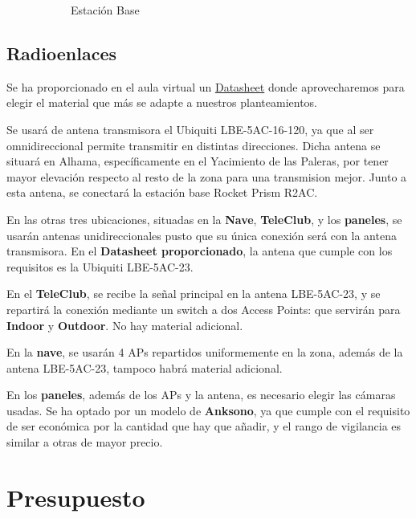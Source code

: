 \documentclass{article}
\begin{document}
\begin{figure}[ht]
\begin{subfigure}{0.25\textwidth}
		\caption{Estación Base}
		\label{fig:estacionbase}
	\end{subfigure}
	\caption{}
	\label{fig:accesspoint}
\end{figure}
\subsection{Radioenlaces}

Se ha proporcionado en el aula virtual un \href{http://www.microcom.com.ar/fotos/ficha7097LBE-M5-23.compressed.pdf}{Datasheet} donde aprovecharemos para elegir el material que más se adapte a nuestros planteamientos. 

\quad

Se usará de antena transmisora el Ubiquiti LBE-5AC-16-120, ya que al ser omnidireccional permite transmitir en distintas direcciones. Dicha antena se situará en Alhama, específicamente en el Yacimiento de las Paleras, por tener mayor elevación respecto al resto de la zona para una transmision mejor. Junto a esta antena, se conectará la estación base Rocket Prism R2AC.

\quad

En las otras tres ubicaciones, situadas en la \textbf{Nave}, \textbf{TeleClub}, y los \textbf{paneles}, se usarán antenas unidireccionales pusto que su única conexión será con la antena transmisora. En el \textbf{Datasheet proporcionado}, la antena que cumple con los requisitos es la Ubiquiti LBE-5AC-23.

En el \textbf{TeleClub}, se recibe la señal principal en la antena LBE-5AC-23, y se repartirá la conexión mediante un switch a dos Access Points: que servirán para \textbf{Indoor} y \textbf{Outdoor}. No hay material adicional.

\quad

En la \textbf{nave}, se usarán 4 APs repartidos uniformemente en la zona, además de la antena LBE-5AC-23, tampoco habrá material adicional.

\quad

En los \textbf{paneles}, además de los APs y la antena, es necesario elegir las cámaras usadas. Se ha optado por un modelo de \textbf{Anksono}, ya que cumple con el requisito de ser económica por la cantidad que hay que añadir, y el rango de vigilancia es similar a otras de mayor precio.

\section{Presupuesto}
\end{document}
